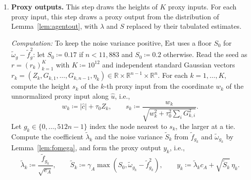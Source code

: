 \documentclass[10pt]{article}
\newcommand{\RR}{\mathbb{R}}
\newcommand{\Est}{\mathrm{Est}}
\newcommand{\chat}{\hat c}
\begin{document}
\begin{enumerate}[leftmargin=*,itemsep=8pt,topsep=10pt plus 2pt]
\item \textbf{Proxy outputs.} This step draws the heights of $K$ proxy
  inputs. For each proxy input, this step draws a proxy output from the
  distribution of Lemma~\ref{lem:agentout}, with $\lambda$ and $S$ replaced by their tabulated
  estimates.

  \emph{Computation:} To keep the noise variance positive, $\Est$ uses a
  floor $S_0$ for $\tilde\omega_g-\tilde f_g^2$: let $S_0\coloneqq 0.17$ if $n<11{,}883$ and $S_0\coloneqq 0.2$
  otherwise. Read the seed as $r=(r_k)_{k=1}^K$ with $K\coloneqq 10^{12}$ and
  independent standard Gaussian vectors
  $r_k=(Z_k,G_{k,1},\dots,G_{k,n-1},\eta_k)\in\RR\times\RR^{n-1}\times\RR^n$.
  For each $k=1,\dots,K$, compute the height $s_k$ of the $k$-th proxy
  input from the coordinate $w_k$ of the unnormalized proxy input along
  $\hat u$, i.e.,
  \[w_k\coloneqq |\chat|+\tau_0Z_k,\qquad
  s_k\coloneqq \frac{w_k}{\sqrt{w_k^2+\tau_0^2\sum_iG_{k,i}^2}}.\]
  Let $g_k\in\{0,\dots,512n-1\}$ index the node nearest to $s_k$, the larger
  at a tie. Compute the coefficient $\tilde\lambda_k$ and the noise variance $\tilde S_k$
  from $\tilde f_{g_k}$ and $\tilde\omega_{g_k}$ by Lemma~\ref{lem:fomega}, and form the proxy output $y_k$, i.e.,
  \[\tilde\lambda_k\coloneqq \frac{\tilde f_{g_k}}{\sqrt{e_A}},\qquad
  \tilde S_k\coloneqq \gamma_A\max(S_0,\tilde\omega_{g_k}-\tilde f_{g_k}^2),\qquad
  y_k\coloneqq \tilde\lambda_kc_A+\sqrt{\tilde S_k}\,\eta_k.\]


\end{enumerate}
\end{document}
